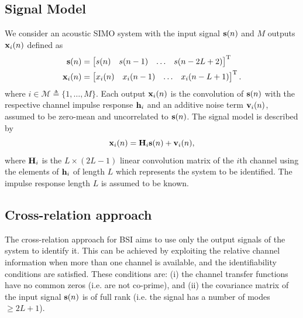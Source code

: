 \documentclass{article}
\newcommand{\h}{\mtxb{h}}
\newcommand{\x}{\mtxb{x}}
\newcommand{\Mset}{\mathcal{M}}
\begin{document}
\subsection{Signal Model}
\label{ssec:signal_model}
We consider an acoustic SIMO system with the input signal \(\bm{\mathrm{s}}(n)\) and \(M\) outputs \(\x_i(n)\) defined as
\begin{align}
    \mtxb{s}(n) &= \begin{bmatrix}
        s(n)&s(n-1)&\ldots&s(n-2L+2)
    \end{bmatrix}^{\T}\\
    \x_i(n) &= \begin{bmatrix}
        x_i(n)&x_i(n-1)&\ldots&x_i(n-L+1)
    \end{bmatrix}^{\T}.
\end{align}
where \(i \in \Mset \triangleq \{1,\ldots,M\} \).
Each output \(\x_i(n)\) is the convolution of \(\bm{\mathrm{s}}(n)\) with the respective channel impulse response \(\h_i\) and an additive noise term \(\bm{\mathrm{v}}_i(n)\), assumed to be zero-mean and uncorrelated to \(\bm{\mathrm{s}}(n)\).
The signal model is described by
\begin{equation}
    \x_i(n) = \mtxb{H}_i \mtxb{s}(n) + \mtxb{v}_i(n),
\end{equation}
where \(\bm{\mathrm{H}}_i\) is the \(L \times (2L-1)\) linear convolution matrix of the \(i\)th channel using the elements of \(\h_i\) of length \(L\) which represents the system to be identified.
The impulse response length \(L\) is assumed to be known.

\subsection{Cross-relation approach}
\label{ssec:cross_rel}
The cross-relation approach for BSI aims to use only the output signals of the system to identify it.
This can be achieved by exploiting the relative channel information when more than one channel is available, and the identifiability conditions \cite{guanghanxuLeastsquaresApproachBlind1995} are satisfied. These conditions are: (i) the channel transfer functions have no common zeros (i.e. are not co-prime), and (ii) the covariance matrix of the input signal \(\bm{\mathrm{s}}(n)\) is of full rank (i.e. the signal has a number of modes \(\geq 2L+1\)).
\end{document}
